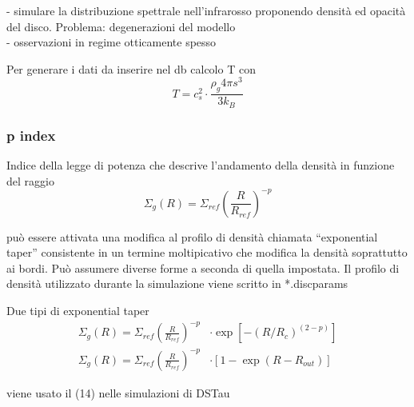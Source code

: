 \documentclass[DIN, pagenumber=false, fontsize=11pt, parskip=half]{scrartcl}
\begin{document}
- simulare la distribuzione spettrale nell'infrarosso proponendo densità ed opacità del disco. Problema: degenerazioni del modello\\
- osservazioni in regime otticamente spesso

Per generare i dati da inserire nel db calcolo T con
\begin{equation}
 T = c_s^2 \cdot\frac{\rho_g4\pi s^3}{3k_B}
\end{equation}


\subsubsection{p index}
\label{pind}
Indice della legge di potenza che descrive l'andamento della densità in funzione del raggio
\begin{equation}
    \Sigma_g(R) = \Sigma_{ref} \left( \frac{R}{R_{ref}}\right)^{-p}
\end{equation}

può essere attivata una modifica al profilo di densità chiamata ``exponential taper'' consistente in un termine moltipicativo che modifica la densità soprattutto ai bordi. Può assumere diverse forme a seconda di quella impostata.
Il profilo di densità utilizzato durante la simulazione viene scritto in *.discparams

Due tipi di exponential taper
\begin{align}
 \Sigma_g(R) = \Sigma_{ref} \left( \frac{R}{R_{ref}}\right)^{-p} &\cdot 
 \exp[-(R/R_c)^{(2-p)}] \\
 \Sigma_g(R) = \Sigma_{ref} \left( \frac{R}{R_{ref}}\right)^{-p} &\cdot
 [1-\exp(R-R_{out})]
\end{align}

viene usato il (14) nelle simulazioni di DSTau
\end{document}
